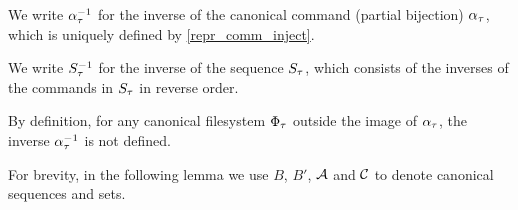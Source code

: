 
\begin{mydef}
We write ${\alpha}_\tau^{-1}$ for
the inverse of the canonical command (partial bijection) ${\alpha}_\tau$,
which is uniquely defined by \cref{repr_comm_inject}.

We write ${S}_\tau^{-1}$ for the inverse of the sequence ${S}_\tau$, which consists of the inverses of the commands in ${S}_\tau$ in reverse order.
\end{mydef}
By definition, for any canonical filesystem ${\Phi}_\tau$ outside the image of 
${\alpha}_\tau$, the inverse ${\alpha}_\tau^{-1}$ is not defined.




For brevity, in the following lemma we use $B$, $B'$, $\mathcal{A}$ and $\mathcal{C}$ to denote
canonical sequences and sets.

\newcommand{\ia}{\sqs{A}}
\newcommand{\ic}{\sqs{C}}
\newcommand{\ibi}{B^{-1}}


